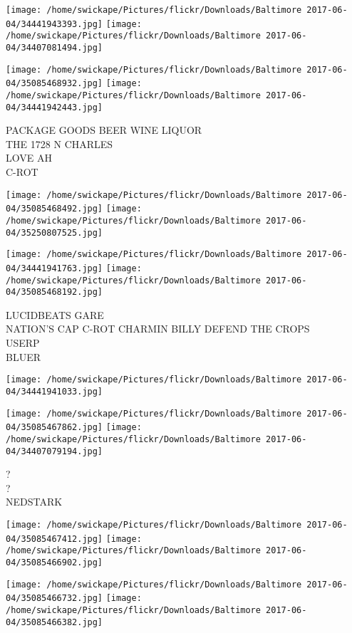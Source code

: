 \documentclass[10pt,letterpaper]{article}
\begin{document}
\texttt{[image: /home/swickape/Pictures/flickr/Downloads/Baltimore 2017-06-04/34441943393.jpg]}
\texttt{[image: /home/swickape/Pictures/flickr/Downloads/Baltimore 2017-06-04/34407081494.jpg]}

\texttt{[image: /home/swickape/Pictures/flickr/Downloads/Baltimore 2017-06-04/35085468932.jpg]}
\texttt{[image: /home/swickape/Pictures/flickr/Downloads/Baltimore 2017-06-04/34441942443.jpg]}

PACKAGE GOODS BEER WINE LIQUOR\\
THE 1728 N CHARLES\\
LOVE AH\\
C{-}ROT\\
\pagebreak

\texttt{[image: /home/swickape/Pictures/flickr/Downloads/Baltimore 2017-06-04/35085468492.jpg]}
\texttt{[image: /home/swickape/Pictures/flickr/Downloads/Baltimore 2017-06-04/35250807525.jpg]}

\texttt{[image: /home/swickape/Pictures/flickr/Downloads/Baltimore 2017-06-04/34441941763.jpg]}
\texttt{[image: /home/swickape/Pictures/flickr/Downloads/Baltimore 2017-06-04/35085468192.jpg]}

LUCIDBEATS GARE\\
NATION'S CAP C{-}ROT CHARMIN BILLY DEFEND THE CROPS\\
USERP\\
BLUER\\
\pagebreak

\texttt{[image: /home/swickape/Pictures/flickr/Downloads/Baltimore 2017-06-04/34441941033.jpg]}

\vspace{0.25in}
\texttt{[image: /home/swickape/Pictures/flickr/Downloads/Baltimore 2017-06-04/35085467862.jpg]}
\texttt{[image: /home/swickape/Pictures/flickr/Downloads/Baltimore 2017-06-04/34407079194.jpg]}

?\\
?\\
NEDSTARK\\
\pagebreak

\texttt{[image: /home/swickape/Pictures/flickr/Downloads/Baltimore 2017-06-04/35085467412.jpg]}
\texttt{[image: /home/swickape/Pictures/flickr/Downloads/Baltimore 2017-06-04/35085466902.jpg]}

\texttt{[image: /home/swickape/Pictures/flickr/Downloads/Baltimore 2017-06-04/35085466732.jpg]}
\texttt{[image: /home/swickape/Pictures/flickr/Downloads/Baltimore 2017-06-04/35085466382.jpg]}
\end{document}
